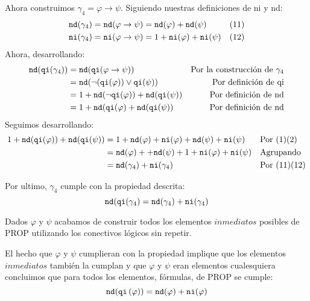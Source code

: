 \documentclass[8pt, letterpaper]{article}
\begin{document}
\begin{enumerate}
   Ahora construimos $\gamma_4 = \varphi \rightarrow \psi$. Siguiendo nuestras
   definiciones de ni y nd:
    \begin{align*}
      {\tt nd}(\gamma_4) &= {\tt nd}(\varphi\rightarrow\psi) = {\tt nd}
      (\varphi) + {\tt nd}(\psi)& (11) \\
      {\tt ni}(\gamma_4) &={\tt ni}(\varphi\rightarrow\psi) = 1 + {\tt ni}
      (\varphi) +
     {\tt ni}(\psi)& (12)
   \end{align*}
   Ahora, desarrollando:
   \begin{align*}
     {\tt nd}({\tt qi}(\gamma_4)) &= {\tt nd}({\tt qi}(\varphi\rightarrow\psi))
     & \text{Por la construcción de } \gamma_4 \\
     &= {\tt nd}(\neg({\tt qi}(\varphi))\lor {\tt qi}(\psi)) & \text{
       Por definición de qi} \\
     &= 1+ {\tt nd}(\neg{\tt qi}(\varphi)) + {\tt nd}({\tt qi}(\psi)) &
     \text{ Por definición de nd} \\
     &= 1+ {\tt nd}({\tt qi}(\varphi) + {\tt nd}({\tt qi}(\psi)) &
     \text{ Por definición de nd} \\
   \end{align*}
   Seguimos desarrollando:
   \begin{align*}
     1+{\tt nd}({\tt qi}(\varphi)) + {\tt nd}({\tt qi}(\psi)) &= 1+
     {\tt nd}(\varphi) + {\tt ni}(\varphi)+{\tt nd}(\psi) + {\tt ni}(\psi)
     & &\text{Por } (1)(2)\\
     &= {\tt nd}(\varphi) ++{\tt nd}(\psi) + 1 + {\tt ni}(\varphi) + 
     {\tt ni}(\psi) & &\text{Agrupando}\\
     &=  {\tt nd}(\gamma_4) + {\tt ni}(\gamma_4)& &\text{Por } (11)(12)
     \end{align*}

   Por ultimo, $\gamma_4$ cumple con la propiedad descrita:
   $${\tt nd}({\tt qi}(\gamma_4) = {\tt nd}(\gamma_4) + {\tt ni}(\gamma_4)$$

   Dados $\varphi$ y $\psi$ acabamos de construir todos los elementos
   $inmediatos$ posibles de PROP utilizando los conectivos lógicos sin repetir.

   El hecho que $\varphi$ y $\psi$ cumplieran con la propiedad implique
   que los elementos $inmediatos$ también la cumplan y que $\varphi$ y $\psi$
   eran elementos cualesquiera concluimos que para todos los elementos,
   fórmulas, de PROP se cumple:
   $${\tt nd}({\tt qi}\,(\varphi)) = {\tt nd}(\varphi) + {\tt ni}(\varphi)$$
\end{enumerate}
\end{document}

